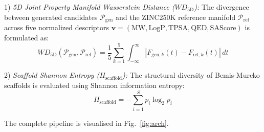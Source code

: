 \documentclass[conference]{IEEEtran}
\begin{document}
1) \textit{5D Joint Property Manifold Wasserstein Distance ($WD_{\text{5D}}$):} The divergence between generated candidates $\mathcal{P}_{\text{gen}}$ and the ZINC250K reference manifold $\mathcal{P}_{\text{ref}}$ across five normalized descriptors $\mathbf{v} = (\text{MW}, \text{LogP}, \text{TPSA}, \text{QED}, \text{SAScore})$ is formulated as:
\begin{equation}
WD_{\text{5D}}(\mathcal{P}_{\text{gen}}, \mathcal{P}_{\text{ref}}) = \frac{1}{5} \sum_{k=1}^5 \int_{-\infty}^{\infty} |F_{\text{gen}, k}(t) - F_{\text{ref}, k}(t)| \, dt
\end{equation}

2) \textit{Scaffold Shannon Entropy ($H_{\text{scaffold}}$):} The structural diversity of Bemis-Murcko scaffolds is evaluated using Shannon information entropy:
\begin{equation}
H_{\text{scaffold}} = -\sum_{i=1}^{S} p_i \log_2 p_i
\end{equation}

The complete pipeline is visualised in Fig.~\ref{fig:arch}.
\end{document}
